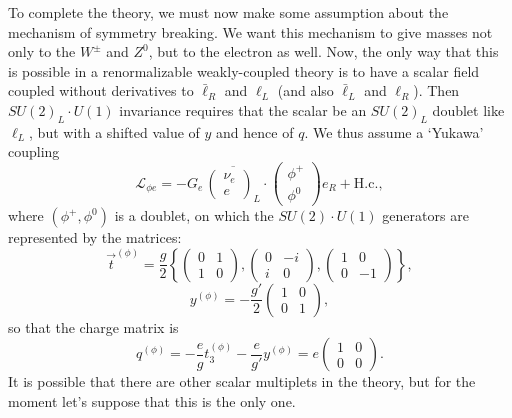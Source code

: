 To complete the theory, we must now make some assumption about the mechanism of symmetry breaking. We want this mechanism to give masses not only to the $W^\pm$ and $Z^0$, but to the electron as well. Now, the only way that this is possible in a renormalizable weakly-coupled theory is to have a scalar field coupled without derivatives to $\bar\ell_R$ and $\ell_L$ (and also $\bar\ell_L$ and $\ell_R$). Then $SU(2)_L\cdot U(1)$ invariance requires that the scalar be an $SU(2)_L$ doublet like $\ell_L$, but with a shifted value of $y$ and hence of $q$. We thus assume a `Yukawa' coupling
\begin{equation}
\mathcal{L}_{\phi e}
=-G_e\,
\overline{\begin{pmatrix}\nu_e\\e\end{pmatrix}_{\!L}}
\cdot
\begin{pmatrix}\phi^+\\\phi^0\end{pmatrix}
e_R+\mathrm{H.c.},
\tag{21.3.21}\label{eq:21.3.21}
\end{equation}
where $(\phi^+,\phi^0)$ is a doublet, on which the $SU(2)\cdot U(1)$ generators are represented by the matrices:
\begin{equation}
\vec t^{(\phi)}
=\frac{g}{2}
\left\{
\begin{pmatrix}0&1\\1&0\end{pmatrix},
\begin{pmatrix}0&-i\\i&0\end{pmatrix},
\begin{pmatrix}1&0\\0&-1\end{pmatrix}
\right\},
\tag{21.3.22}\label{eq:21.3.22}
\end{equation}
\begin{equation}
y^{(\phi)}=-\frac{g'}{2}
\begin{pmatrix}1&0\\0&1\end{pmatrix},
\tag{21.3.23}\label{eq:21.3.23}
\end{equation}
so that the charge matrix is
\begin{equation}
q^{(\phi)}
=-\frac{e}{g}t_3^{(\phi)}-\frac{e}{g'}y^{(\phi)}
=e\begin{pmatrix}1&0\\0&0\end{pmatrix}.
\tag{21.3.24}\label{eq:21.3.24}
\end{equation}
It is possible that there are other scalar multiplets in the theory, but for the moment let's suppose that this is the only one.

